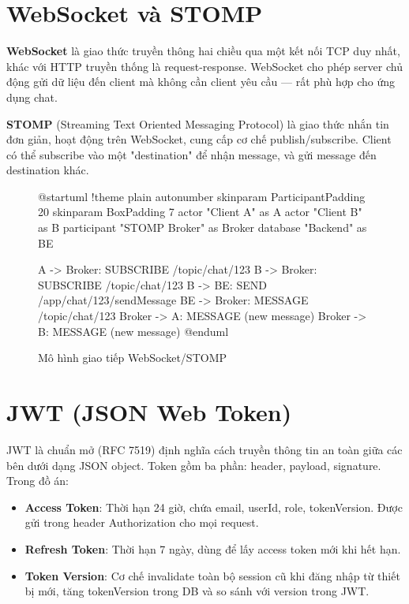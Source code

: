 \documentclass[12pt,a4paper]{report}
\begin{document}
\section{WebSocket và STOMP}

\textbf{WebSocket} là giao thức truyền thông hai chiều qua một kết nối TCP duy nhất, khác với HTTP truyền thống là request-response. WebSocket cho phép server chủ động gửi dữ liệu đến client mà không cần client yêu cầu --- rất phù hợp cho ứng dụng chat.

\textbf{STOMP} (Streaming Text Oriented Messaging Protocol) là giao thức nhắn tin đơn giản, hoạt động trên WebSocket, cung cấp cơ chế publish/subscribe. Client có thể subscribe vào một "destination" để nhận message, và gửi message đến destination khác.

\begin{figure}[H]
    \centering
    \begin{plantuml}
        @startuml
        !theme plain
        autonumber
        skinparam ParticipantPadding 20
        skinparam BoxPadding 7
        actor "Client A" as A
        actor "Client B" as B
        participant "STOMP Broker" as Broker
        database "Backend" as BE

        A -> Broker: SUBSCRIBE /topic/chat/123
        B -> Broker: SUBSCRIBE /topic/chat/123
        B -> BE: SEND /app/chat/123/sendMessage
        BE -> Broker: MESSAGE /topic/chat/123
        Broker -> A: MESSAGE (new message)
        Broker -> B: MESSAGE (new message)
        @enduml
    \end{plantuml}
    \caption{Mô hình giao tiếp WebSocket/STOMP}
\end{figure}

\section{JWT (JSON Web Token)}

JWT là chuẩn mở (RFC 7519) định nghĩa cách truyền thông tin an toàn giữa các bên dưới dạng JSON object. Token gồm ba phần: header, payload, signature. Trong đồ án:

\begin{itemize}
    \item \textbf{Access Token}: Thời hạn 24 giờ, chứa email, userId, role, tokenVersion. Được gửi trong header Authorization cho mọi request.
    \item \textbf{Refresh Token}: Thời hạn 7 ngày, dùng để lấy access token mới khi hết hạn.
    \item \textbf{Token Version}: Cơ chế invalidate toàn bộ session cũ khi đăng nhập từ thiết bị mới, tăng tokenVersion trong DB và so sánh với version trong JWT.
\end{itemize}
\end{document}
